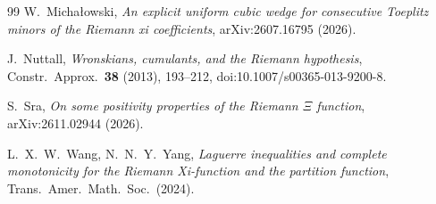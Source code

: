 \documentclass[11pt,a4paper]{article}
\numberwithin{equation}{section}
\theoremstyle{definition}
\theoremstyle{remark}
\begin{document}
\begin{thebibliography}{99}
W.~Michałowski,
\emph{An explicit uniform cubic wedge for consecutive Toeplitz minors of the Riemann xi coefficients},
arXiv:2607.16795 (2026).

J.~Nuttall,
\emph{Wronskians, cumulants, and the Riemann hypothesis},
Constr.\ Approx.\ \textbf{38} (2013), 193--212, doi:10.1007/s00365-013-9200-8.

S.~Sra,
\emph{On some positivity properties of the Riemann $\Xi$ function},
arXiv:2611.02944 (2026).

L.~X.~W.~Wang, N.~N.~Y.~Yang,
\emph{Laguerre inequalities and complete monotonicity for the Riemann Xi-function and the partition function},
Trans.\ Amer.\ Math.\ Soc.\ (2024).

\end{thebibliography}
\end{document}
